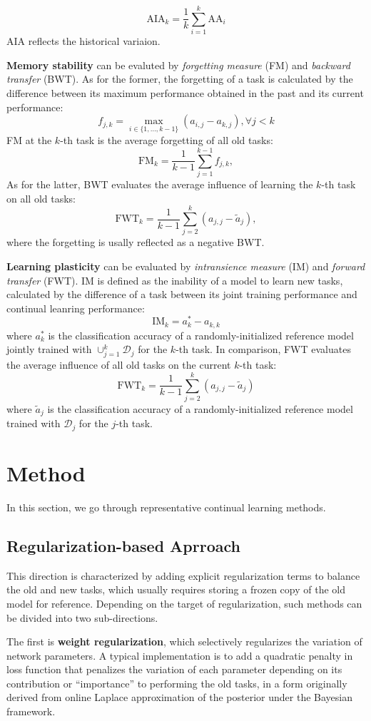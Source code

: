 \begin{equation*}
    \mathrm{AIA}_{k}=\frac{1}{k} \sum_{i=1}^{k} \mathrm{AA}_{i}
\end{equation*}
AIA reflects the historical variaion.

\textbf{Memory stability} can be evaluted by \textit{forgetting measure} (FM) and \textit{backward transfer} (BWT). As for the former, the forgetting of a task is calculated by the difference between its maximum performance obtained in the past and its current performance:
\begin{equation*}
    f_{j, k}=\max _{i \in\{1, \ldots, k-1\}}\left(a_{i, j}-a_{k, j}\right), \forall j<k
\end{equation*}
FM at the \(k\)-th task is the average forgetting of all old tasks:
$$
    \mathrm{FM}_{k}=\frac{1}{k-1} \sum_{j=1}^{k-1} f_{j, k},
$$
As for the latter, BWT evaluates the average influence of learning the \(k\)-th task on all old tasks:
$$
    \mathrm{FWT}_{k}=\frac{1}{k-1} \sum_{j=2}^{k}\left(a_{j, j}-\tilde{a}_{j}\right),
$$
where the forgetting is usally reflected as a negative BWT.

\textbf{Learning plasticity} can be evaluated by \textit{intransience measure} (IM) and \textit{forward transfer} (FWT). IM is defined as the inability of a model to learn new tasks, calculated by the difference of a task between its joint training performance and continual leanring performance:
$$
    \mathrm{IM}_{k}=a_{k}^{*}-a_{k, k}
$$
where \(a_{k}^{*}\) is the classification accuracy of a randomly-initialized reference model jointly trained with \(\cup_{j=1}^{k} \mathcal{D}_{j}\) for the \(k\)-th task. In comparison, FWT evaluates the average influence of all old tasks on the current \(k\)-th task:
$$
    \mathrm{FWT}_{k}=\frac{1}{k-1} \sum_{j=2}^{k}\left(a_{j, j}-\tilde{a}_{j}\right)
$$
where \(\tilde{a}_{j}\) is the classification accuracy of a randomly-initialized reference model trained with \(\mathcal{D}_{j}\) for the \(j\)-th task.

\section{Method}

In this section, we go through representative continual learning methods.

\subsection{Regularization-based Aprroach}
This direction is characterized by adding explicit regularization terms to balance the old and new tasks, which usually requires storing a frozen copy of the old model for reference. Depending on the target of regularization, such methods can be divided into two sub-directions.

The first is \textbf{weight regularization}, which selectively regularizes the variation of network parameters. A typical implementation is to add a quadratic penalty in loss function that penalizes the variation of each parameter depending on its contribution or ``importance'' to performing the old tasks, in a form originally derived from online Laplace approximation of the posterior under the Bayesian framework.